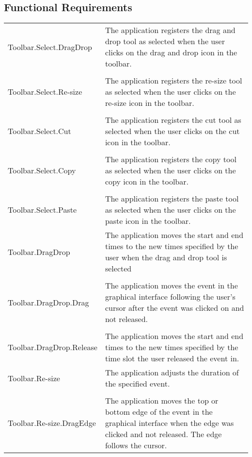 \documentclass{scrreprt}
\begin{document}
\subsection{Functional Requirements}
\begin{center}
    \begin{longtable}{ | p{6cm} | p{9cm} | }
    \hline
    Toolbar.Select.DragDrop & The application registers the drag and drop tool
    as selected when the user clicks on the drag and drop icon in the toolbar.\\
    & \\
    Toolbar.Select.Re-size & The application registers the re-size tool as selected
    when the user clicks on the re-size icon in the toolbar.\\
    & \\
    Toolbar.Select.Cut & The application registers the cut tool
    as selected when the user clicks on the cut icon in the toolbar.\\
    & \\
    Toolbar.Select.Copy & The application registers the copy tool as selected
    when the user clicks on the copy icon in the toolbar.\\
    & \\
    Toolbar.Select.Paste & The application registers the paste tool as selected
    when the user clicks on the paste icon in the toolbar.\\
    \hline
    Toolbar.DragDrop & The application moves the start and end times to the new
    times specified by the user when the drag and drop tool is selected\\
    & \\
    Toolbar.DragDrop.Drag & The application moves the event in the graphical
    interface following the user's cursor after the event was clicked on and
    not released.\\
    & \\
    Toolbar.DragDrop.Release & The application moves the start and end times to
    the new times specified by the time slot the user released the event in.\\
    \hline
    Toolbar.Re-size & The application adjusts the duration of the specified event.\\
    & \\
    Toolbar.Re-size.DragEdge & The application moves the top or bottom edge
    of the event in the graphical interface when the edge was clicked and not
    released. The edge follows the cursor.\\

\end{longtable}
\end{center}
\end{document}
